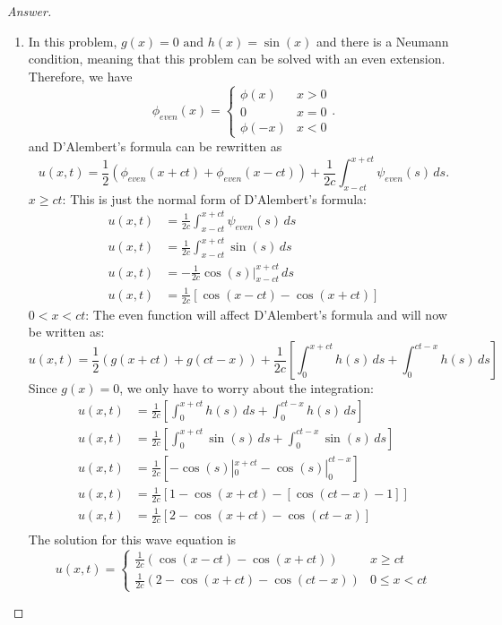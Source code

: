 \documentclass{article}
\theoremstyle{definition}
\renewcommand\qedsymbol{$\blacksquare$}
\newenvironment{ans}{\begin{proof}[Answer]\renewcommand{\qedsymbol}{}}{\end{proof}}
\begin{document}
\begin{ans}
\begin{enumerate}[(1), start=9]
    \item In this problem, $g(x)=0 \text{ and } h(x) = \sin{(x)}$ and there is a Neumann condition, meaning that this problem can be solved with an even extension. Therefore, we have
    \[\phi_{even}(x) = \begin{cases}
        \phi(x) & x > 0\\
        0 & x = 0\\
        \phi(-x) & x < 0
    \end{cases}.\]
    and D'Alembert's formula can be rewritten as
    \[u(x,t) = \frac{1}{2}(\phi_{even}(x+ct) + \phi_{even}(x-ct)) + \frac{1}{2c}\int_{x-ct}^{x+ct}\psi_{even}(s)\,ds.\]
    \underline{$x \geq ct$}: This is just the normal form of D'Alembert's formula:
    \begin{align*}
        u(x,t) &= \frac{1}{2c}\int_{x-ct}^{x+ct}\psi_{even}(s)\,ds\\
        u(x,t) &= \frac{1}{2c}\int_{x-ct}^{x+ct}\sin{(s)}\,ds\\
        u(x,t) &= -\frac{1}{2c} \cos{(s)}|_{x-ct}^{x+ct}\,ds\\
        u(x,t) &= \frac{1}{2c} [\cos{(x-ct)} - \cos{(x+ct)}]
    \end{align*}
    \underline{$0 < x < ct$}: The even function will affect D'Alembert's formula and will now be written as:
    \[u(x,t) = \frac{1}{2}(g(x+ct) + g(ct-x)) + \frac{1}{2c}\left[\int_0^{x+ct}h(s)\,ds + \int_0^{ct-x}h(s)\,ds\right]\]
    Since $g(x) = 0$, we only have to worry about the integration:
    \begin{align*}
        u(x,t) &= \frac{1}{2c} \left[\int_0^{x+ct}h(s)\,ds + \int_0^{ct-x}h(s)\,ds\right]\\
        u(x,t) &= \frac{1}{2c} \left[\int_0^{x+ct}\sin{(s)}\,ds + \int_0^{ct-x}\sin{(s)}\,ds\right]\\
        u(x,t) &= \frac{1}{2c} \left[ -\cos{(s)}|_0^{x+ct} - \cos{(s)}|_0^{ct-x} \right]\\
        u(x,t) &= \frac{1}{2c} \left[ 1 - \cos{(x+ct)} - [ \cos{(ct-x)} - 1 ] \right]\\
        u(x,t) &= \frac{1}{2c} \left[ 2 - \cos{(x+ct)} - \cos{(ct-x)} \right]\\
    \end{align*}
    The solution for this wave equation is
    \[\boxed{u(x,t) = \begin{cases}
        \frac{1}{2c}(\cos{(x-ct)} - \cos{(x+ct)} ) & x \geq ct\\
        \frac{1}{2c}(2 - \cos{(x+ct)} - \cos{(ct-x)} ) & 0 \leq x < ct
    \end{cases}}\]


\end{enumerate}
\end{ans}
\end{document}
